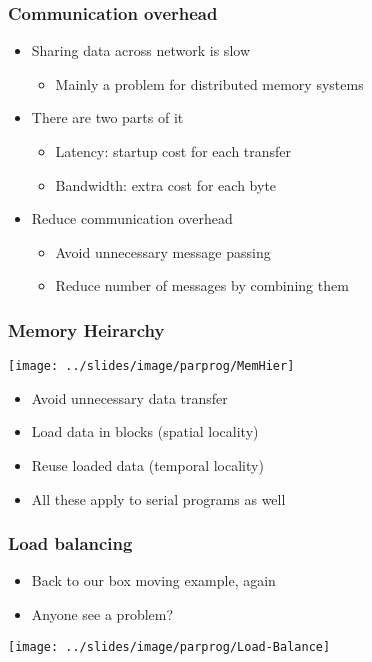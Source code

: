 \documentclass[10pt,t]{beamer}
\begin{document}
\begin{frame}
  \frametitle{Communication overhead}
  \begin{itemize}
  \item Sharing data across network is slow
    \begin{itemize}
    \item Mainly a problem for distributed memory systems
    \end{itemize}
  \item There are two parts of it
    \begin{itemize}
    \item Latency: startup cost for each transfer
    \item Bandwidth: extra cost for each byte
    \end{itemize}
  \item Reduce communication overhead
    \begin{itemize}
    \item Avoid unnecessary message passing
    \item Reduce number of messages by combining them
    \end{itemize}
  \end{itemize}
\end{frame}

\begin{frame}
  \frametitle{Memory Heirarchy}
  \texttt{[image: ../slides/image/parprog/MemHier]}
  \begin{itemize}
  \item Avoid unnecessary data transfer
  \item Load data in blocks (spatial locality)
  \item Reuse loaded data (temporal locality)
  \item All these apply to serial programs as well
  \end{itemize}
\end{frame}

\begin{frame}
  \frametitle{Load balancing}
  \begin{itemize}
  \item Back to our box moving example, again
  \item Anyone see a problem?
  \end{itemize}
  \texttt{[image: ../slides/image/parprog/Load-Balance]}
\end{frame}
\end{document}
